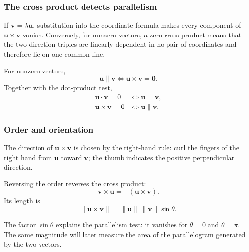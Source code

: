 \subsubsection*{The cross product detects parallelism}

\begin{proofbox}
If $\mathbf v=\lambda\mathbf u$, substitution into the coordinate formula makes
every component of $\mathbf u\times\mathbf v$ vanish. Conversely, for nonzero
vectors, a zero cross product means that the two direction triples are linearly
dependent in no pair of coordinates and therefore lie on one common line.
\end{proofbox}

\begin{theorembox}
For nonzero vectors,
\[
\boxed{
\mathbf u\parallel\mathbf v
\iff
\mathbf u\times\mathbf v=\mathbf0
}.
\]
Together with the dot-product test,
\[
\boxed{
\begin{aligned}
\mathbf u\cdot\mathbf v=0
&\iff \mathbf u\perp\mathbf v,\\
\mathbf u\times\mathbf v=\mathbf0
&\iff \mathbf u\parallel\mathbf v.
\end{aligned}
}
\]
\end{theorembox}

\subsubsection*{Order and orientation}

\begin{definitionbox}
The direction of $\mathbf u\times\mathbf v$ is chosen by the right-hand rule:
curl the fingers of the right hand from $\mathbf u$ toward $\mathbf v$; the
thumb indicates the positive perpendicular direction.
\end{definitionbox}

\begin{theorembox}
Reversing the order reverses the cross product:
\[
\boxed{
\mathbf v\times\mathbf u
=-(\mathbf u\times\mathbf v)
}.
\]
Its length is
\[
\boxed{
\|\mathbf u\times\mathbf v\|
=\|\mathbf u\|\,\|\mathbf v\|\sin\theta
}.
\]
\end{theorembox}

\begin{interpretationbox}
The factor $\sin\theta$ explains the parallelism test: it vanishes for
$\theta=0$ and $\theta=\pi$. The same magnitude will later measure the area of
the parallelogram generated by the two vectors.
\end{interpretationbox}

